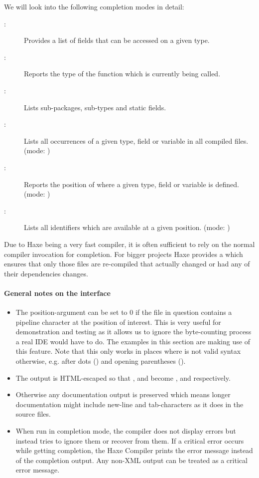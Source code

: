 We will look into the following completion modes in detail:

\begin{description}
	\item[:] Provides a list of fields that can be accessed on a given type.
	\item[:] Reports the type of the function which is currently being called.
	\item[:] Lists sub-packages, sub-types and static fields.
	\item[:] Lists all occurrences of a given type, field or variable in all compiled files. (mode: )
	\item[:] Reports the position of where a given type, field or variable is defined. (mode: )
	\item[:] Lists all identifiers which are available at a given position. (mode: )
\end{description}

Due to Haxe being a very fast compiler, it is often sufficient to rely on the normal compiler invocation for completion. For bigger projects Haxe provides a  which ensures that only those files are re-compiled that actually changed or had any of their dependencies changes.

\paragraph{General notes on the interface}
\label{cr-completion-interface-notes}

\begin{itemize}
	\item The position-argument can be set to 0 if the file in question contains a pipeline \ic{|} character at the position of interest. This is very useful for demonstration and testing as it allows us to ignore the byte-counting process a real IDE would have to do. The examples in this section are making use of this feature. Note that this only works in places where \ic{|} is not valid syntax otherwise, e.g. after dots () and opening parentheses (\ic{(|}).
	\item The output is HTML-escaped so that \ic{\&}, \ic{<} and \ic{>} become ,  and  respectively.
	\item Otherwise any documentation output is preserved which means longer documentation might include new-line and tab-characters as it does in the source files.
	\item When run in completion mode, the compiler does not display errors but instead tries to ignore them or recover from them.  If a critical error occurs while getting completion, the Haxe Compiler prints the error message instead of the completion output. Any non-XML output can be treated as a critical error message.
\end{itemize}


